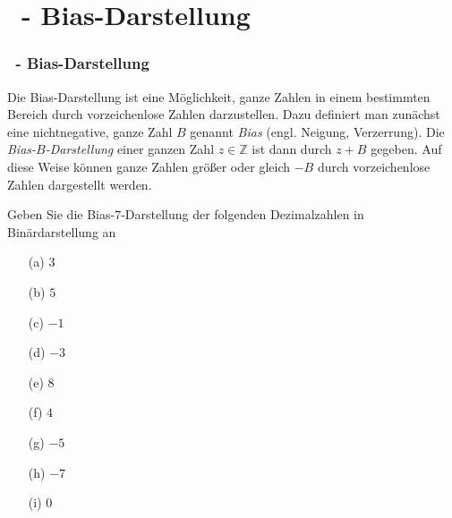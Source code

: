 \def\stitle{\theexercise\ - Bias-Darstellung}
\section{\stitle}
\begin{frame}[t]
  \frametitle{\stitle}


Die Bias-Darstellung ist eine Möglichkeit, ganze Zahlen in einem bestimmten Bereich durch vorzeichenlose Zahlen darzustellen. Dazu definiert man zunächst eine nichtnegative, ganze Zahl $B$ genannt \emph{Bias} (engl. Neigung, Verzerrung). Die \emph{Bias-$B$-Darstellung} einer ganzen Zahl $z \in \mathbb{Z}$ ist dann durch $z + B$ gegeben.
Auf diese Weise können ganze Zahlen größer oder gleich $-B$ durch vorzeichenlose Zahlen dargestellt werden.

Geben Sie die Bias-$7$-Darstellung der folgenden Dezimalzahlen in Binärdarstellung an
\begin{center}
\begin{minipage}{0.3\textwidth}
\begin{enumerate}
\item[(a)] $3$
\item[(b)] $5$
\item[(c)] $-1$
\end{enumerate}
\end{minipage}
\begin{minipage}{0.3\textwidth}
\begin{enumerate}
\item[(d)] $-3$
\item[(e)] $8$
\item[(f)] $4$
\end{enumerate}
\end{minipage}
\begin{minipage}{0.3\textwidth}
\begin{enumerate}
\item[(g)] $-5$
\item[(h)] $-7$
\item[(i)] $0$
\end{enumerate}
\end{minipage}
\end{center}


\end{frame}

